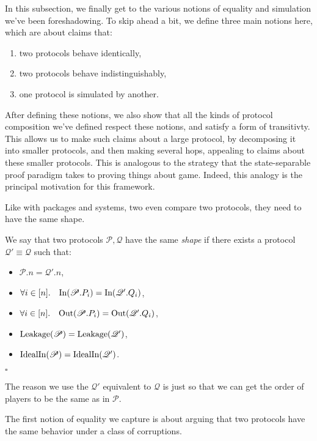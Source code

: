 In this subsection, we finally get to the various notions
of equality and simulation we've been foreshadowing.
To skip ahead a bit, we define three main notions here, which
are about claims that:
\begin{enumerate}
  \item two protocols behave identically,
  \item two protocols behave indistinguishably,
  \item one protocol is simulated by another.
\end{enumerate}
After defining these notions, we also show that all the kinds
of protocol composition we've defined respect these notions,
and satisfy a form of transitivty.
This allows us to make such claims about a large protocol,
by decomposing it into smaller protocols, and then making
several hops, appealing to claims about these smaller protocols.
This is analogous to the strategy that the state-separable proof
paradigm takes to proving things about game.
Indeed, this analogy is the principal motivation for this framework.

Like with packages and systems, two even compare two protocols,
they need to have the same shape.

\begin{definition}[Shape]
  \label{def:shape}
  We say that two protocols $\mathscr{P}, \mathscr{Q}$ have the same \emph{shape}
  if there exists a protocol $\mathscr{Q}' \equiv \mathscr{Q}$ such that:
  \begin{itemize}
    \item $\mathscr{P}.n = \mathscr{Q}'.n$,
    \item $\forall i \in [n].\quad \text{In}(\mathscr{P}.P_i) = \text{In}(\mathscr{Q}'.Q_i)$,
    \item $\forall i \in [n].\quad \text{Out}(\mathscr{P}.P_i) = \text{Out}(\mathscr{Q}'.Q_i)$,
    \item $\text{Leakage}(\mathscr{P}) = \text{Leakage}(\mathscr{Q}')$,
    \item $\text{IdealIn}(\mathscr{P}) = \text{IdealIn}(\mathscr{Q}')$.
  \end{itemize}

  $\square$
\end{definition}

The reason we use the $\mathscr{Q}'$ equivalent to $\mathscr{Q}$
is just so that we can get the order of players to be the same
as in $\mathscr{P}$.

The first notion of equality we capture is about arguing
that two protocols have the same behavior under a class of corruptions.

